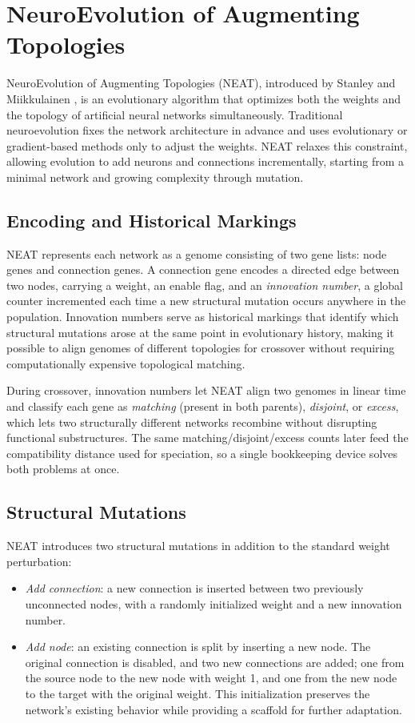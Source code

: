 \section{NeuroEvolution of Augmenting Topologies}

NeuroEvolution of Augmenting Topologies (NEAT), introduced by Stanley and Miikkulainen \cite{stanley2002evolving}, is an evolutionary algorithm that optimizes both the weights and the topology of artificial neural networks simultaneously. Traditional neuroevolution fixes the network architecture in advance and uses evolutionary or gradient-based methods only to adjust the weights. NEAT relaxes this constraint, allowing evolution to add neurons and connections incrementally, starting from a minimal network and growing complexity through mutation.

\subsection{Encoding and Historical Markings}

NEAT represents each network as a genome consisting of two gene lists: node genes and connection genes. A connection gene encodes a directed edge between two nodes, carrying a weight, an enable flag, and an \textit{innovation number}, a global counter incremented each time a new structural mutation occurs anywhere in the population. Innovation numbers serve as historical markings that identify which structural mutations arose at the same point in evolutionary history, making it possible to align genomes of different topologies for crossover without requiring computationally expensive topological matching.

During crossover, innovation numbers let NEAT align two genomes in linear time and classify each gene as \emph{matching} (present in both parents), \emph{disjoint}, or \emph{excess}, which lets two structurally different networks recombine without disrupting functional substructures. The same matching/disjoint/excess counts later feed the compatibility distance used for speciation, so a single bookkeeping device solves both problems at once.

\subsection{Structural Mutations}

NEAT introduces two structural mutations in addition to the standard weight perturbation:

\begin{itemize}
    \item \textit{Add connection}: a new connection is inserted between two previously unconnected nodes, with a randomly initialized weight and a new innovation number.
    \item \textit{Add node}: an existing connection is split by inserting a new node. The original connection is disabled, and two new connections are added; one from the source node to the new node with weight 1, and one from the new node to the target with the original weight. This initialization preserves the network's existing behavior while providing a scaffold for further adaptation.
\end{itemize}

